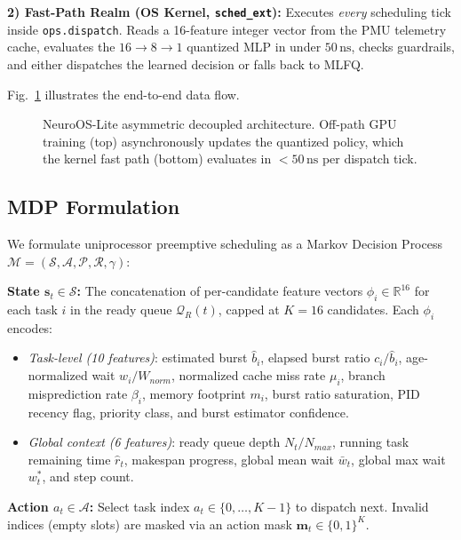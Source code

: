 \smallskip
\noindent\textbf{2) Fast-Path Realm (OS Kernel, \texttt{sched\_ext}):} Executes
\emph{every} scheduling tick inside \texttt{ops.dispatch}. Reads a
16-feature integer vector from the PMU telemetry cache, evaluates the
$16\to 8\to 1$ quantized MLP in under $50\,\text{ns}$, checks
guardrails, and either dispatches the learned decision or falls back to
MLFQ.

\smallskip
Fig.~\ref{fig:arch} illustrates the end-to-end data flow.

\begin{figure}[t]
  \centering
  \caption{NeuroOS-Lite asymmetric decoupled architecture. Off-path GPU training
    (top) asynchronously updates the quantized policy, which the kernel fast
    path (bottom) evaluates in $<50\,\text{ns}$ per dispatch tick.}
  \label{fig:arch}
\end{figure}

\subsection{MDP Formulation}
\label{subsec:mdp}

We formulate uniprocessor preemptive scheduling as a Markov Decision Process
$\mathcal{M} = (\mathcal{S}, \mathcal{A}, \mathcal{P}, \mathcal{R}, \gamma)$:

\smallskip
\noindent\textbf{State $\mathbf{s}_t \in \mathcal{S}$:} The concatenation of per-candidate
feature vectors $\phi_i \in \mathbb{R}^{16}$ for each task $i$ in the ready
queue $\mathcal{Q}_R(t)$, capped at $K = 16$ candidates. Each $\phi_i$
encodes:
\begin{itemize}
  \item \textit{Task-level (10 features)}: estimated burst $\hat{b}_i$, elapsed
    burst ratio $c_i/\hat{b}_i$, age-normalized wait $w_i/W_{norm}$,
    normalized cache miss rate $\mu_i$, branch misprediction rate
    $\beta_i$, memory footprint $m_i$, burst ratio saturation, PID
    recency flag, priority class, and burst estimator confidence.
  \item \textit{Global context (6 features)}: ready queue depth $N_t/N_{max}$,
    running task remaining time $\hat{r}_t$, makespan progress, global mean
    wait $\bar{w}_t$, global max wait $w^*_t$, and step count.
\end{itemize}

\smallskip
\noindent\textbf{Action $a_t \in \mathcal{A}$:} Select task index $a_t \in \{0,\ldots,K-1\}$ to dispatch next. Invalid indices (empty slots) are
masked via an action mask $\mathbf{m}_t \in \{0,1\}^K$.

